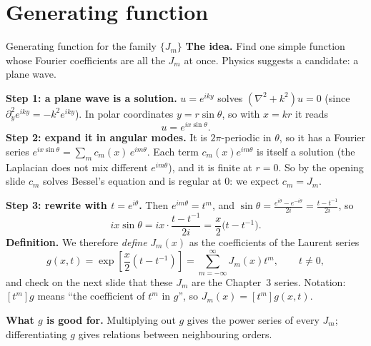 \documentclass[11pt]{beamer}
\begin{document}
\section{Generating function}

\begin{frame}[allowframebreaks=1.00]{Generating function for the family $\{J_m\}$}
\footnotesize
\textbf{The idea.} Find one simple function whose Fourier coefficients are all the \(J_m\) at once.
Physics suggests a candidate: a plane wave.

\textbf{Step 1: a plane wave is a solution.} \(u=e^{iky}\) solves \((\nabla^2+k^2)u=0\) (since
\(\partial_y^2e^{iky}=-k^2e^{iky}\)). In polar coordinates \(y=r\sin\theta\), so with \(x=kr\) it reads
\[
 u=e^{ix\sin\theta}.
\]
\textbf{Step 2: expand it in angular modes.} It is \(2\pi\)-periodic in \(\theta\), so it has a Fourier series
\(e^{ix\sin\theta}=\sum_mc_m(x)\,e^{im\theta}\). Each term \(c_m(x)e^{im\theta}\) is itself a solution (the Laplacian
does not mix different \(e^{im\theta}\)), and it is finite at \(r=0\). So by the opening slide \(c_m\) solves
Bessel's equation and is regular at \(0\): we expect \(c_m=J_m\).
\par\framebreak\par
\textbf{Step 3: rewrite with \(t=e^{i\theta}\).} Then \(e^{im\theta}=t^m\), and
\(\sin\theta=\frac{e^{i\theta}-e^{-i\theta}}{2i}=\frac{t-t^{-1}}{2i}\), so
\[
 ix\sin\theta=ix\cdot\frac{t-t^{-1}}{2i}=\frac x2\bigl(t-t^{-1}\bigr).
\]
\textbf{Definition.} We therefore \emph{define} \(J_m(x)\) as the coefficients of the Laurent series
\begin{equation}
 g(x,t)=\exp\left[\frac x2(t-t^{-1})\right]
       =\sum_{m=-\infty}^{\infty}J_m(x)t^m,\qquad t\ne0,
 \label{eq:genf}
\end{equation}
and check on the next slide that these \(J_m\) are the Chapter~3 series. Notation: \([t^m]g\) means ``the
coefficient of \(t^m\) in \(g\)'', so \(J_m(x)=[t^m]g(x,t)\).

\textbf{What \(g\) is good for.} Multiplying out \(g\) gives the power series of every \(J_m\); differentiating
\(g\) gives relations between neighbouring orders.
\end{frame}
\end{document}
